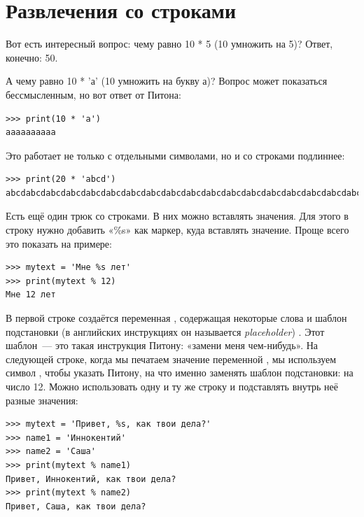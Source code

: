 \section{Развлечения со строками}

Вот есть интересный вопрос: чему равно 10 * 5 (10 умножить на 5)? Ответ, конечно: 50.


А чему равно 10 * 'а' (10 умножить на букву а)? Вопрос может показаться бессмысленным, но вот ответ от Питона:

\begin{listing}
\begin{verbatim}
>>> print(10 * 'a')
aaaaaaaaaa
\end{verbatim}
\end{listing}

Это работает не только с отдельными символами, но и со строками подлиннее:

\begin{listing}
\begin{verbatim}
>>> print(20 * 'abcd')
abcdabcdabcdabcdabcdabcdabcdabcdabcdabcdabcdabcdabcdabcdabcdabcdabcdabcdabcdabcd
\end{verbatim}
\end{listing}

Есть ещё один трюк со строками. В них можно вставлять значения. Для этого в строку нужно добавить «\%s» как маркер, куда вставлять значение. Проще всего это показать на примере:

\begin{listing}
\begin{verbatim}
>>> mytext = 'Мне %s лет'
>>> print(mytext % 12)
Мне 12 лет
\end{verbatim}
\end{listing}

В первой строке создаётся переменная , содержащая некоторые слова и шаблон подстановки (в английских инструкциях он называется \emph{placeholder}) . Этот шаблон — это такая инструкция Питону: «замени меня чем-нибудь». На следующей строке, когда мы печатаем значение переменной , мы используем символ \code{\%}, чтобы указать Питону, на что именно заменять шаблон подстановки: на число 12. Можно использовать одну и ту же строку и подставлять внутрь неё разные значения:

\begin{listing}
\begin{verbatim}
>>> mytext = 'Привет, %s, как твои дела?'
>>> name1 = 'Иннокентий'
>>> name2 = 'Саша'
>>> print(mytext % name1)
Привет, Иннокентий, как твои дела?
>>> print(mytext % name2)
Привет, Саша, как твои дела?
\end{verbatim}
\end{listing}

